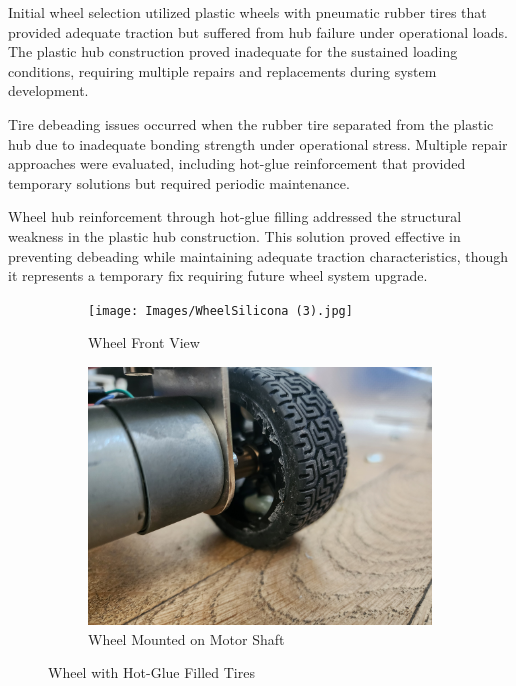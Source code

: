 Initial wheel selection utilized plastic wheels with pneumatic rubber tires that provided adequate traction but suffered from hub failure under operational loads. The plastic hub construction proved inadequate for the sustained loading conditions, requiring multiple repairs and replacements during system development.

Tire debeading issues occurred when the rubber tire separated from the plastic hub due to inadequate bonding strength under operational stress. Multiple repair approaches were evaluated, including hot-glue reinforcement that provided temporary solutions but required periodic maintenance.

Wheel hub reinforcement through hot-glue filling addressed the structural weakness in the plastic hub construction. This solution proved effective in preventing debeading while maintaining adequate traction characteristics, though it represents a temporary fix requiring future wheel system upgrade.

\begin{figure}[H]
    \centering
    \begin{subfigure}{0.45\textwidth}
        \centering
        \texttt{[image: Images/WheelSilicona (3).jpg]}
        \caption{Wheel Front View}
        \label{fig:wheel_hotglue}
    \end{subfigure}
    \hfill
    \begin{subfigure}{0.45\textwidth}
        \centering
        \includegraphics[width=\textwidth]{Images/WheelSilicona.jpg}
        \caption{Wheel Mounted on Motor Shaft}
        \label{fig:wheel_silicone}
    \end{subfigure}
    \caption{Wheel with Hot-Glue Filled Tires}
    \label{fig:combined}
\end{figure}

